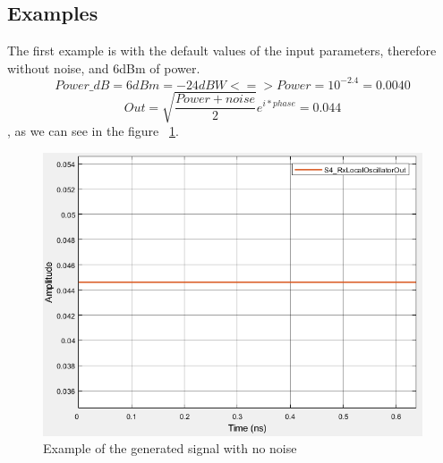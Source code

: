 \subsection*{Examples}

The first example is with the default values of the input parameters, therefore without noise,  and 6dBm of power. \newline
\begin{equation*}
Power\_dB=6dBm=-24dBW<=>Power=10^{-2.4}=0.0040
\end{equation*}
\begin{equation*}
  Out=\sqrt{\frac{Power+noise}{2}}e^{i*phase}=0.044
\end{equation*}
, as we can see in the figure
~\ref{Example_localOscillator}.

\begin{figure}[H]
	\centering
    \includegraphics[scale=0.45]{./lib/local_oscillator/Figures/NoNoise.png}
    	\caption{Example of the generated signal with no noise }\label{Example_localOscillator}
\end{figure}

